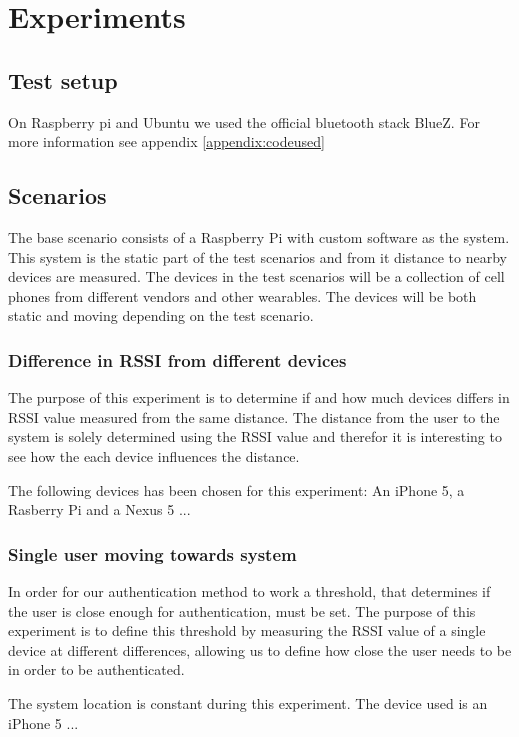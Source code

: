 \section{Experiments}

\subsection{Test setup}

On Raspberry pi and Ubuntu we used the official bluetooth stack BlueZ.
For more information see appendix \ref{appendix:codeused}

\subsection{Scenarios}

The base scenario consists of a Raspberry Pi with custom software as the system.
This system is the static part of the test scenarios and from it distance to nearby devices are measured.
The devices in the test scenarios will be a collection of cell phones from different vendors and other wearables.
The devices will be both static and moving depending on the test scenario.


\subsubsection{Difference in RSSI from different devices}
The purpose of this experiment is to determine if and how much devices differs in RSSI value measured from the same distance. The distance from the user to the system is solely determined using the RSSI value and therefor it is interesting to see how the each device influences the distance.
	
The following devices has been chosen for this experiment: An iPhone 5, a Rasberry Pi and a Nexus 5 ... 

\subsubsection{Single user moving towards system}
\label{section:MovingTowardsSystem}
In order for our authentication method to work a threshold, that determines if the user is close enough for authentication, must be set. The purpose of this experiment is to define this threshold by measuring the RSSI value of a single device at different differences, allowing us to define how close the user needs to be in order to be authenticated. 

The system location is constant during this experiment. The device used is an iPhone 5 ...

